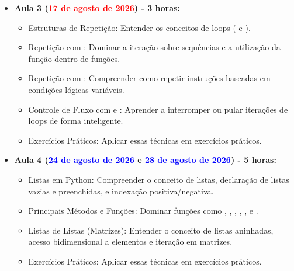 \begin{itemize}
    \item \textbf{Aula 3 (\textcolor{red}{17 de agosto de 2026}) - 3 horas:}
    \begin{itemize}\justifying
        \item Estruturas de Repetição: Entender os conceitos de loops ( e ).
        \item Repetição com : Dominar a iteração sobre sequências e a utilização da função  dentro de funções.
        \item Repetição com : Compreender como repetir instruções baseadas em condições lógicas variáveis.
        \item Controle de Fluxo com  e : Aprender a interromper ou pular iterações de loops de forma inteligente.
        \item Exercícios Práticos: Aplicar essas técnicas em exercícios práticos.
    \end{itemize}


    \item \textbf{Aula 4 (\textcolor{blue}{24 de agosto de 2026} e \textcolor{blue}{28 de agosto de 2026}) - 5 horas:}

    \begin{itemize}\justifying
        \item Listas em Python: Compreender o conceito de listas, declaração de listas vazias e preenchidas, e indexação positiva/negativa.
        
        \item Principais Métodos e Funções: Dominar funções como , , , , ,  e .

        \item Listas de Listas (Matrizes): Entender o conceito de listas aninhadas, acesso bidimensional a elementos e iteração em matrizes.

        \item Exercícios Práticos: Aplicar essas técnicas em exercícios práticos.

    \end{itemize}



\end{itemize}
